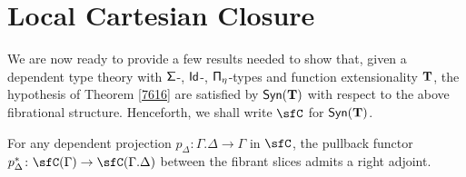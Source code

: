 \section{Local Cartesian Closure}

We are now ready to provide a few results needed to show that, given a dependent
type theory with $\operatorname{\mathsf{\Sigma}}$-, $\operatorname{\mathsf{Id}}$-, $\operatorname{\mathsf{\Pi}_\eta}$-types and function
extensionality $\operatorname{\mathbf{T}}$, the hypothesis of Theorem \ref{7616} are satisfied by
$\mathsf{Syn}(\mathbf{T})$ with respect to the above fibrational structure. Henceforth, we shall
write $\sfC$ for $\mathsf{Syn}(\mathbf{T})$.

\begin{lem}\label{radj}
  For any dependent projection $p_\Delta\colon\Gamma.\Delta\rightarrow\Gamma$ in
  $\sfC$, the pullback functor
  $p_\Delta^*\colon\sfC(\Gamma)\rightarrow\sfC(\Gamma.\Delta)$ between the
  fibrant slices admits a right adjoint.
\end{lem}
